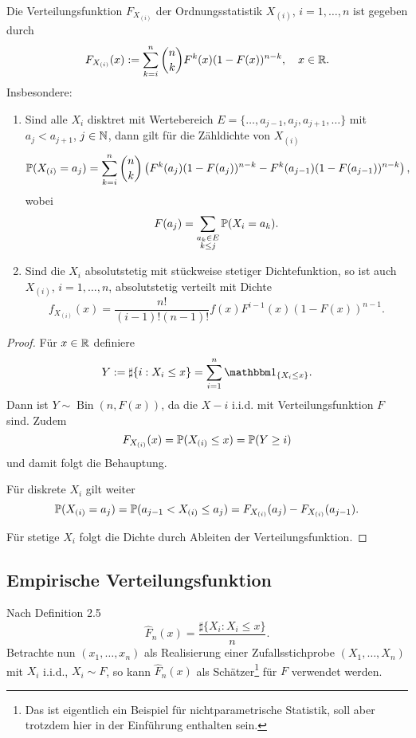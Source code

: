 \begin{thm}
  Die Verteilungsfunktion $F_{X_{(i)}}$ der Ordnungsstatistik $X_{(i)}$, $i = 1,
  \ldots, n$ ist gegeben durch
  \[ F_{X_{(i)}}(x) := \sum_{k=i}^n \binom{n}{k} F^k(x) (1-F(x))^{n-k}, \quad x
    \in \mathbb{R}. \]
  Insbesondere:
  \begin{enumerate}
  \item Sind alle $X_i$ disktret mit Wertebereich $E = \{ \ldots, a_{j-1}, a_j,
    a_{j+1}, \ldots \}$ mit $a_j < a_{j+1}$, $j \in \mathbb{N}$, dann gilt für die
    Zähldichte von $X_{(i)}$
    \[ \mathbb{P}( X_{(i)} = a_j ) = \sum_{k=i}^n \binom{n}{k} \left(
        F^k(a_j)(1-F(a_j))^{n-k} - F^k(a_{j-1})(1-F(a_{j-1}))^{n-k} \right), \]
    wobei
    \[ F(a_j) = \sum_{\substack{a_k \in E \\ k \le j}} \mathbb{P}(X_i = a_k). \]
  \item Sind die $X_i$ absolutstetig mit stückweise stetiger Dichtefunktion, so
    ist auch $X_{(i)}$, $i = 1, \ldots, n$, absolutstetig verteilt mit Dichte
    \[ f_{X_{(i)}}(x) = \frac{n!}{(i-1)!(n-1)!} f(x)
      F^{i-1}(x)(1-F(x))^{n-1}. \]
  \end{enumerate}
\end{thm}

\begin{proof}
  Für $x \in \mathbb{R}$ definiere
  \[ Y := \sharp \{ i : X_i \le x \} = \sum_{i=1}^n \ind_{\{X_i \le x\}}. \]
  Dann ist $Y \sim \operatorname{Bin}(n, F(x))$, da die $X-i$ i.i.d. mit
  Verteilungsfunktion $F$ sind. Zudem
  \[ F_{X_{(i)}}(x) = \mathbb{P}( X_{(i)} \le x ) = \mathbb{P}( Y \ge i ) \]
  und damit folgt die Behauptung.

  Für diskrete $X_i$ gilt weiter
  \[ \mathbb{P}( X_{(i)} = a_j ) = \mathbb{P}( a_{j-1} < X_{(i)} \le a_j ) = F_{X_{(i)}}(a_j)
    - F_{X_{(i)}}(a_{j-1}). \]

  Für stetige $X_i$ folgt die Dichte durch Ableiten der Verteilungsfunktion.
\end{proof}

\subsection{Empirische Verteilungsfunktion}
Nach Definition 2.5
\[ \hat{F}_n(x) = \frac{ \sharp \{ X_i : X_i \le x \}}{n}. \]
Betrachte nun $(x_1, \ldots, x_n)$ als Realisierung einer Zufallsstichprobe
$(X_1, \ldots, X_n)$ mit $X_i$ i.i.d., $X_i \sim F$, so kann $\hat{F}_n(x)$ als
Schätzer\footnote{Das ist eigentlich ein Beispiel für nichtparametrische
  Statistik, soll aber trotzdem hier in der Einführung enthalten sein.} für $F$
verwendet werden.

